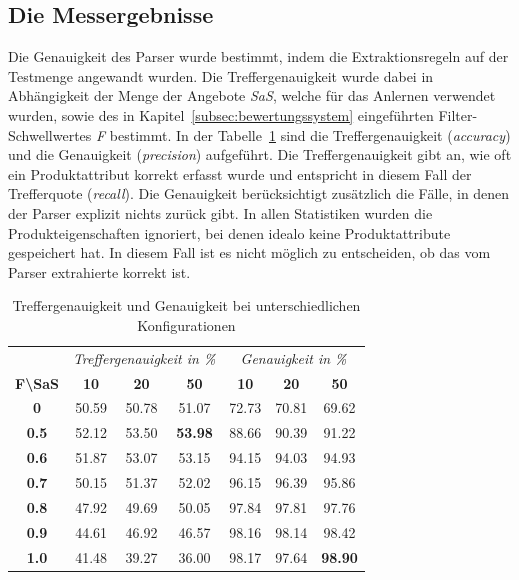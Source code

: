 \subsection{Die Messergebnisse}
\label{subsec:genauigkeitsmessung}
Die Genauigkeit des Parser wurde bestimmt, indem die Extraktionsregeln auf der Testmenge angewandt wurden.
Die Treffergenauigkeit wurde dabei in Abhängigkeit der Menge der Angebote \textit{SaS}, welche für das Anlernen
verwendet wurden, sowie des in Kapitel~\ref{subsec:bewertungssystem} eingeführten Filter-Schwellwertes \textit{F}
bestimmt.
In der Tabelle~\ref{tab:accuracy-precision} sind die Treffergenauigkeit (\textit{accuracy}) und die Genauigkeit
(\textit{precision}) aufgeführt.
Die Treffergenauigkeit gibt an, wie oft ein Produktattribut korrekt erfasst wurde und entspricht in diesem Fall der
Trefferquote (\textit{recall}).
Die Genauigkeit berücksichtigt zusätzlich die Fälle, in denen der Parser explizit nichts zurück gibt.
In allen Statistiken wurden die Produkteigenschaften ignoriert, bei denen idealo keine Produktattribute gespeichert hat.
In diesem Fall ist es nicht möglich zu entscheiden, ob das vom Parser extrahierte korrekt ist.

\begin{table}[h]
    \centering
    \begin{tabular}{ c | c c c | c c c }
        &   \multicolumn{3}{c}{\textit{Treffergenauigkeit in \%}}    &   \multicolumn{3}{c}{\textit{Genauigkeit in \%}} \\
        \textbf{F\textbackslash SaS} & \textbf{10} & \textbf{20} & \textbf{50} & \textbf{10} & \textbf{20} & \textbf{50}  \\
        \hline
        \textbf{0}       &   50.59 &   50.78 &   51.07         &   72.73 &   70.81 &   69.62 \\
        \textbf{0.5}     &   52.12 &   53.50 &   \textbf{53.98}&   88.66 &   90.39 &   91.22 \\
        \textbf{0.6}     &   51.87 &   53.07 &   53.15         &   94.15 &   94.03 &   94.93 \\
        \textbf{0.7}     &   50.15 &   51.37 &   52.02         &   96.15 &   96.39 &   95.86 \\
        \textbf{0.8}     &   47.92 &   49.69 &   50.05         &   97.84 &   97.81 &   97.76 \\
        \textbf{0.9}     &   44.61 &   46.92 &   46.57         &   98.16 &   98.14 &   98.42 \\
        \textbf{1.0}     &   41.48 &   39.27 &   36.00         &   98.17 &   97.64 &   \textbf{98.90}

    \end{tabular}
    \caption{Treffergenauigkeit und Genauigkeit bei unterschiedlichen Konfigurationen}
    \label{tab:accuracy-precision}
\end{table}

